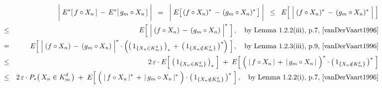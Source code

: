 \begin{eqnarray*}
&&
	\left\vert\; \overset{{\color{white}-}}{E^{*}}[\,f \circ X_{n}\,] \,-\, E^{*}[\,g_{m} \circ X_{n}\,] \;\right\vert
\;\; = \;\;
	\left\vert\; \overset{{\color{white}-}}{E}\!\left[\,
		(f \overset{{\color{white}.}}{\circ} X_{n})^{*}
		\,-\,
		(g_{m} \circ X_{n})^{*}
	\,\right] \;\right\vert
\;\; \leq \;\;
	E\!\left[\;\left\vert\;
		(f \overset{{\color{white}.}}{\circ} X_{n})^{*}
		\,\overset{{\color{white}.}}{-}\,
		(g_{m} \circ X_{n})^{*}
	\;\right\vert\;\right]
\\
& \leq &
	E\!\left[\;\left\vert\;
		(f \overset{{\color{white}.}}{\circ} X_{n})
		\,\overset{{\color{white}.}}{-}\,
		(g_{m} \circ X_{n})
	\;\right\vert^{*}\;\right],
	\quad
	\textnormal{by Lemma 1.2.2(iii), p.7, \cite{vanDerVaart1996}}
\\
& = &
	E\!\left[\;
		\left\vert\;
		(f \overset{{\color{white}.}}{\circ} X_{n})
		\,\overset{{\color{white}.}}{-}\,
		(g_{m} \circ X_{n})
		\;\right\vert^{*}
		\cdot
		\left(
		\left(\,1_{\{X_{n} \in K^{\delta}_{m}\}}\,\right)_{*}
		\,+\,
		\left(\,1_{\{X_{n} \notin K^{\delta}_{m}\}}\,\right)^{*}
		\right)
	\;\right],
	\quad
	\textnormal{by Lemma 1.2.3(iii), p.9, \cite{vanDerVaart1996}}
\\
& \leq &
	2\,\varepsilon\cdot
	E\!\left[\;
		\left(\,1_{\{X_{n} \in K^{\delta}_{m}\}}\,\right)_{*}
	\;\right]
	\;+\;
	E\!\left[\;
		\left(\;
		\vert\,f \overset{{\color{white}.}}{\circ} X_{n}\,\vert
		\,\overset{{\color{white}.}}{+}\,
		\vert\,g_{m} \circ X_{n}\,\vert
		\;\right)^{*}
		\cdot
		\left(\,1_{\{X_{n} \notin K^{\delta}_{m}\}}\,\right)^{*}
	\;\right]
\\
& \leq &
	2\,\varepsilon \cdot P_{*}\!\left(\,X_{n} \in K^{\delta}_{m}\,\right)
	\;+\;
	E\!\left[\;
		\left(\;
		\vert\,f \overset{{\color{white}.}}{\circ} X_{n}\,\vert^{*}
		\,\overset{{\color{white}.}}{+}\,
		\vert\,g_{m} \circ X_{n}\,\vert^{*}
		\;\right)
		\cdot
		\left(\,1_{\{X_{n} \notin K^{\delta}_{m}\}}\,\right)^{*}
	\;\right],
	\quad
	\textnormal{by Lemma 1.2.2(i), p.7, \cite{vanDerVaart1996}}

\end{eqnarray*}

